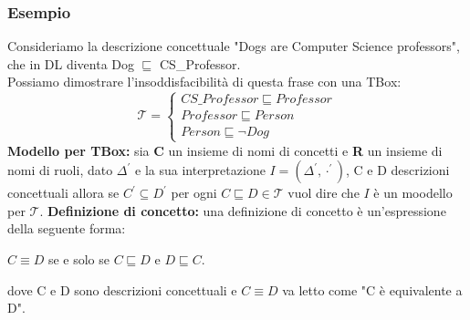 \documentclass[../main.tex]{subfiles}
\newcommand{\spazio}{\vspace{2em} \newline}
\begin{document}
   \subsubsection{Esempio}
   Consideriamo la descrizione concettuale "Dogs are Computer Science professors", che in DL diventa Dog $\sqsubseteq$ CS\_Professor.\\
   Possiamo dimostrare l'insoddisfacibilità di questa frase con una TBox:
   \begin{equation*}
      \mathcal{T}=
      \begin{cases}
         CS\_Professor \sqsubseteq Professor\\
         Professor \sqsubseteq Person\\
         Person \sqsubseteq \lnot Dog
      \end{cases}
   \end{equation*}
   \spazio
   \textbf{Modello per TBox:} sia \textbf{C} un insieme di nomi di concetti e \textbf{R} un insieme di nomi di ruoli, dato $\Delta^\prime$ e la sua interpretazione $I = (\Delta^\prime, \cdot^\prime)$, C e D descrizioni concettuali allora se $C^\prime \subseteq D^\prime$ per ogni $C \sqsubseteq D \in \mathcal{T}$ vuol dire che $I$ è un moodello per $\mathcal{T}$.
   \spazio
   \textbf{Definizione di concetto:} una definizione di concetto è un'espressione della seguente forma:
   \begin{center}
      $C \equiv D$ se e solo se $C \sqsubseteq D$ e $D \sqsubseteq C$.
   \end{center}
   dove C e D sono descrizioni concettuali e $C \equiv D$ va letto come "C è equivalente a D".
\end{document}
